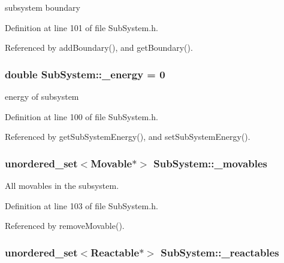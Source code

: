 subsystem boundary 



Definition at line 101 of file Sub\+System.\+h.



Referenced by add\+Boundary(), and get\+Boundary().

\hypertarget{classSubSystem_ad6f7f51491f99102870b8907926acc40}{
\subsubsection[{\+\_\+energy}]{\setlength{\rightskip}{0pt plus 5cm}double Sub\+System\+::\+\_\+energy = 0\hspace{0.3cm}{\ttfamily [private]}}}\label{classSubSystem_ad6f7f51491f99102870b8907926acc40}


energy of subsystem 



Definition at line 100 of file Sub\+System.\+h.



Referenced by get\+Sub\+System\+Energy(), and set\+Sub\+System\+Energy().

\hypertarget{classSubSystem_a746593123598cdda62ba3d3c51d31111}{
\subsubsection[{\+\_\+movables}]{\setlength{\rightskip}{0pt plus 5cm}unordered\+\_\+set$<${\bf Movable}$\ast$$>$ Sub\+System\+::\+\_\+movables\hspace{0.3cm}{\ttfamily [private]}}}\label{classSubSystem_a746593123598cdda62ba3d3c51d31111}


All movables in the subsystem. 



Definition at line 103 of file Sub\+System.\+h.



Referenced by remove\+Movable().

\hypertarget{classSubSystem_af9ffdc91d0631686e9f433729a216858}{
\subsubsection[{\+\_\+reactables}]{\setlength{\rightskip}{0pt plus 5cm}unordered\+\_\+set$<${\bf Reactable}$\ast$$>$ Sub\+System\+::\+\_\+reactables\hspace{0.3cm}{\ttfamily [private]}}}\label{classSubSystem_af9ffdc91d0631686e9f433729a216858}


